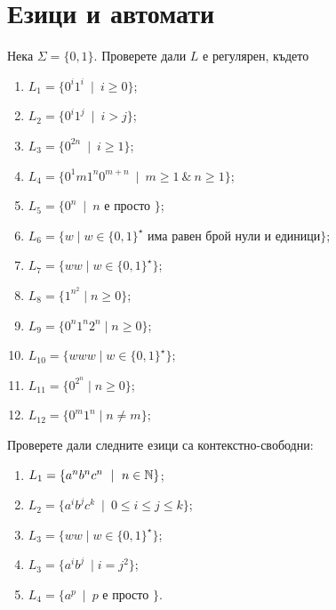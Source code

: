 \chapter{Езици и автомати}

\begin{problem}
  Нека $\Sigma = \{0,1\}$.  Проверете дали $L$ е регулярен, където
  \begin{enumerate}[1)]
  \item
    $L_1 = \{0^i1^i\ \mid\ i\geq 0\}$;
  \item
    $L_2 = \{0^i1^j\ \mid\ i > j\}$;
  \item
    $L_3 = \{0^{2n}\ \mid\ i\geq 1\}$;
  \item
    $L_4 = \{0^1m1^n0^{m+n}\ \mid\ m\geq 1\ \&\ n\geq 1\}$;
  \item
    $L_5 = \{0^n\ \mid\ n\mbox{ е просто }\}$;
  \item
    $L_6 = \{w\mid w\in\{0,1\}^\star\mbox{ има равен брой нули и единици}\}$;
  \item
    $L_7 = \{ww\mid w\in\{0,1\}^\star\}$;
  \item
    $L_8 = \{1^{n^2}\mid n\geq 0\}$;
  \item
    $L_{9} = \{0^n1^n2^n\mid n\geq 0\}$;
  \item
    $L_{10} = \{www\mid w\in \{0,1\}^\star\}$;
  \item
    $L_{11} = \{0^{2^n}\mid n\geq 0\}$;
  \item
    $L_{12} = \{0^m1^n\mid n\neq m\}$;
  \end{enumerate}
\end{problem}


\begin{problem}
  Проверете дали следните езици са контекстно-свободни:
  \begin{enumerate}
  \item
    $L_1 = \{a^nb^nc^n\ \mid\ n\in\N\}$;
  \item
    $L_2 = \{a^ib^jc^k\ \mid\ 0 \leq i \leq j \leq k\}$;
  \item
    $L_3 = \{ww\mid w\in \{0,1\}^\star\}$;
  \item
    $L_3 = \{a^ib^j\ \mid i = j^2\}$;
  \item
    $L_4 = \{a^p\ \mid\ p\mbox{ е просто }\}$.
  \end{enumerate}
\end{problem}

